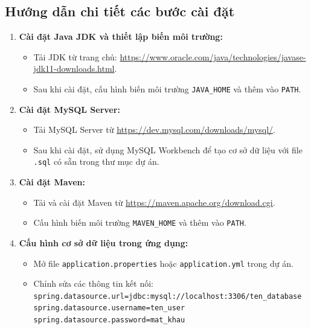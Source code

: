 \documentclass{article}
\begin{document}
\subsection{Hướng dẫn chi tiết các bước cài đặt}
    \begin{enumerate}
        \item \textbf{Cài đặt Java JDK và thiết lập biến môi trường:}
        \begin{itemize}
            \item Tải JDK từ trang chủ: \href{https://www.oracle.com/java/technologies/javase-jdk11-downloads.html}{https://www.oracle.com/java/technologies/javase-jdk11-downloads.html}.
            \item Sau khi cài đặt, cấu hình biến môi trường \verb|JAVA_HOME| và thêm vào \verb|PATH|.
        \end{itemize}
        \item \textbf{Cài đặt MySQL Server:}
        \begin{itemize}
            \item Tải MySQL Server từ \href{https://dev.mysql.com/downloads/mysql/}{https://dev.mysql.com/downloads/mysql/}.
            \item Sau khi cài đặt, sử dụng MySQL Workbench để tạo cơ sở dữ liệu với file \verb|.sql| có sẵn trong thư mục dự án.
        \end{itemize}
        \item \textbf{Cài đặt Maven:}
        \begin{itemize}
            \item Tải và cài đặt Maven từ \href{https://maven.apache.org/download.cgi}{https://maven.apache.org/download.cgi}.
            \item Cấu hình biến môi trường \verb|MAVEN_HOME| và thêm vào \verb|PATH|.
        \end{itemize}
        \item \textbf{Cấu hình cơ sở dữ liệu trong ứng dụng:}
        \begin{itemize}
            \item Mở file \verb|application.properties| hoặc \verb|application.yml| trong dự án.
            \item Chỉnh sửa các thông tin kết nối:\\
        \verb|spring.datasource.url=jdbc:mysql://localhost:3306/ten_database|
        \verb|spring.datasource.username=ten_user|\\
        \verb|spring.datasource.password=mat_khau|
        \end{itemize}

\end{enumerate}
\end{document}
